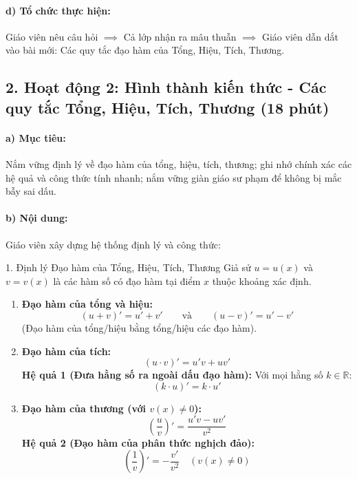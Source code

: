 \documentclass[12pt, a4paper]{article}
\begin{document}
\paragraph{d) Tổ chức thực hiện:} Giáo viên nêu câu hỏi $\implies$ Cả lớp nhận ra mâu thuẫn $\implies$ Giáo viên dẫn dắt vào bài mới: Các quy tắc đạo hàm của Tổng, Hiệu, Tích, Thương.

\subsection*{2. Hoạt động 2: Hình thành kiến thức - Các quy tắc Tổng, Hiệu, Tích, Thương (18 phút)}

\paragraph{a) Mục tiêu:} Nắm vững định lý về đạo hàm của tổng, hiệu, tích, thương; ghi nhớ chính xác các hệ quả và công thức tính nhanh; nắm vững giàn giáo sư phạm để không bị mắc bẫy sai dấu.

\paragraph{b) Nội dung:} Giáo viên xây dựng hệ thống định lý và công thức:

\begin{pedabox}{1. Định lý Đạo hàm của Tổng, Hiệu, Tích, Thương}
Giả sử $u = u(x)$ và $v = v(x)$ là các hàm số có đạo hàm tại điểm $x$ thuộc khoảng xác định.
\begin{enumerate}[leftmargin=0.6cm]
    \item \textbf{Đạo hàm của tổng và hiệu:}
    \begin{equation}
        (u + v)' = u' + v' \qquad \text{và} \qquad (u - v)' = u' - v'
    \end{equation}
    (Đạo hàm của tổng/hiệu bằng tổng/hiệu các đạo hàm).
    \item \textbf{Đạo hàm của tích:}
    \begin{equation}
        (u \cdot v)' = u'v + uv'
    \end{equation}
    \textbf{Hệ quả 1 (Đưa hằng số ra ngoài dấu đạo hàm):} Với mọi hằng số $k \in \mathbb{R}$:
    \begin{equation}
        (k \cdot u)' = k \cdot u'
    \end{equation}
    \item \textbf{Đạo hàm của thương (với $v(x) \neq 0$):}
    \begin{equation}
        \left( \dfrac{u}{v} \right)' = \dfrac{u'v - uv'}{v^2}
    \end{equation}
    \textbf{Hệ quả 2 (Đạo hàm của phân thức nghịch đảo):}
    \begin{equation}
        \left( \dfrac{1}{v} \right)' = -\dfrac{v'}{v^2} \quad (v(x) \neq 0)
    \end{equation}
\end{enumerate}
\end{pedabox}
\end{document}
